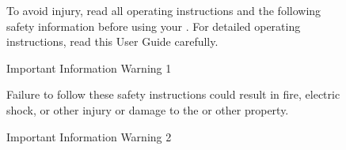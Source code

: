 
\begin{figure}[t]
\centering
To avoid injury, read all operating instructions and the following safety information before using your \touchmore{}. For detailed operating instructions, read this User Guide carefully.
\caption{Important Information Warning 1}
\end{figure}

\begin{figure}[t]
\centering
Failure to follow these safety instructions could result in fire, electric shock, or other injury or damage to the \touchmore{} or other property.
\caption{Important Information Warning 2}
\end{figure}